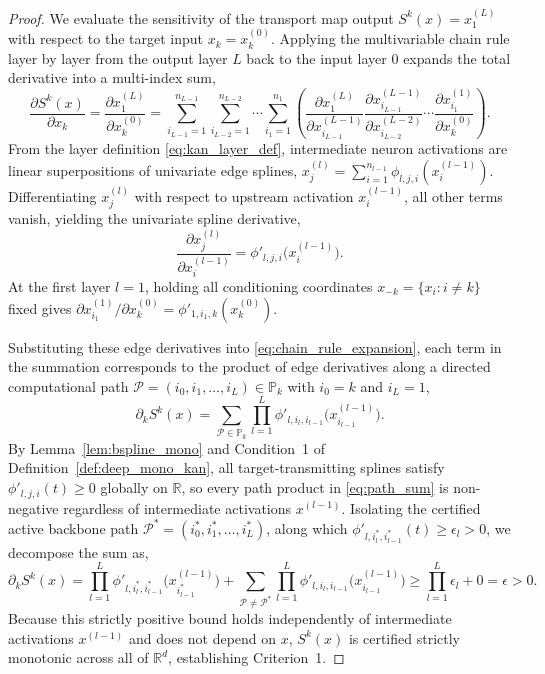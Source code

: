 \documentclass[11pt,a4paper]{article}
\theoremstyle{plain}
\theoremstyle{definition}
\theoremstyle{remark}
\begin{document}
\begin{proof}
We evaluate the sensitivity of the transport map output $S^k(x) = x^{(L)}_1$ with respect to the target input $x_k = x^{(0)}_k$. Applying the multivariable chain rule layer by layer from the output layer $L$ back to the input layer $0$ expands the total derivative into a multi-index sum,
\begin{equation}
    \frac{\partial S^k(x)}{\partial x_k} = \frac{\partial x^{(L)}_1}{\partial x^{(0)}_k} = \sum_{i_{L-1}=1}^{n_{L-1}} \sum_{i_{L-2}=1}^{n_{L-2}} \cdots \sum_{i_1=1}^{n_1} \left( \frac{\partial x^{(L)}_1}{\partial x^{(L-1)}_{i_{L-1}}} \frac{\partial x^{(L-1)}_{i_{L-1}}}{\partial x^{(L-2)}_{i_{L-2}}} \cdots \frac{\partial x^{(1)}_{i_1}}{\partial x^{(0)}_k} \right).
    \label{eq:chain_rule_expansion}
\end{equation}
From the layer definition \eqref{eq:kan_layer_def}, intermediate neuron activations are linear superpositions of univariate edge splines, $x^{(l)}_j = \sum_{i=1}^{n_{l-1}} \phi_{l, j, i}(x^{(l-1)}_i)$. Differentiating $x^{(l)}_j$ with respect to upstream activation $x^{(l-1)}_i$, all other terms vanish, yielding the univariate spline derivative,
\begin{equation}
    \frac{\partial x^{(l)}_j}{\partial x^{(l-1)}_i} = \phi'_{l, j, i}\big(x^{(l-1)}_i\big).
\end{equation}
At the first layer $l=1$, holding all conditioning coordinates $x_{-k} = \{x_i : i \neq k\}$ fixed gives $\partial x^{(1)}_{i_1} / \partial x^{(0)}_k = \phi'_{1, i_1, k}(x^{(0)}_k)$.

Substituting these edge derivatives into \eqref{eq:chain_rule_expansion}, each term in the summation corresponds to the product of edge derivatives along a directed computational path $\mathcal{P} = (i_0, i_1, \dots, i_L) \in \mathbb{P}_k$ with $i_0 = k$ and $i_L = 1$,
\begin{equation}
    \partial_k S^k(x) = \sum_{\mathcal{P} \in \mathbb{P}_k} \prod_{l=1}^L \phi'_{l, i_l, i_{l-1}}\big(x^{(l-1)}_{i_{l-1}}\big).
    \label{eq:path_sum}
\end{equation}
By Lemma~\ref{lem:bspline_mono} and Condition~1 of Definition~\ref{def:deep_mono_kan}, all target-transmitting splines satisfy $\phi'_{l, j, i}(t) \ge 0$ globally on $\mathbb{R}$, so every path product in \eqref{eq:path_sum} is non-negative regardless of intermediate activations $x^{(l-1)}$. Isolating the certified active backbone path $\mathcal{P}^* = (i_0^*, i_1^*, \dots, i_L^*)$, along which $\phi'_{l, i_l^*, i_{l-1}^*}(t) \ge \epsilon_l > 0$, we decompose the sum as,
\begin{equation}
    \partial_k S^k(x) = \prod_{l=1}^L \phi'_{l, i_l^*, i_{l-1}^*}\big(x^{(l-1)}_{i_{l-1}^*}\big) + \sum_{\mathcal{P} \neq \mathcal{P}^*} \prod_{l=1}^L \phi'_{l, i_l, i_{l-1}}\big(x^{(l-1)}_{i_{l-1}}\big) \ge \prod_{l=1}^L \epsilon_l + 0 = \epsilon > 0.
\end{equation}
Because this strictly positive bound holds independently of intermediate activations $x^{(l-1)}$ and does not depend on $x$, $S^k(x)$ is certified strictly monotonic across all of $\mathbb{R}^d$, establishing Criterion~1.


\end{proof}
\end{document}
